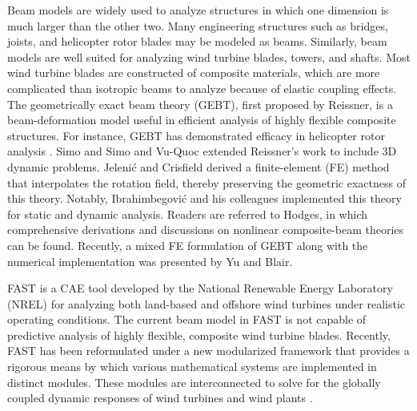 \documentclass{aiaa-tc}
\begin{document}
Beam models are widely used to analyze structures in which one dimension is much larger than the other two.  Many engineering
structures such as  bridges, joists, and helicopter
rotor blades may be modeled as beams.  Similarly, beam models are well suited for analyzing wind turbine blades, towers, and shafts.  Most wind turbine
blades are constructed of composite materials, which are more complicated than isotropic beams to analyze because of elastic coupling
effects.  The geometrically exact beam theory (GEBT), first proposed by
Reissner\cite{Ressiner1973}, is a beam-deformation model useful in efficient analysis of highly flexible composite structures.
For instance, GEBT has demonstrated efficacy in helicopter rotor analysis \cite{Hodges:2007}. 
Simo\cite{Simo1985} and Simo and Vu-Quoc\cite{Simo1986} extended Reissner's
work to include 3D dynamic problems. Jeleni\'c and
Crisfield\cite{Crisfield1999} derived a finite-element (FE) method that
interpolates the rotation field, thereby preserving the geometric exactness
of this theory. Notably, Ibrahimbegovi\'c and his colleagues
implemented this theory for static\cite{Ibrahim1995} and
dynamic\cite{Ibrahim1998} analysis. Readers are referred to
Hodges\cite{HodgesBeamBook}, in which comprehensive derivations and discussions
on nonlinear composite-beam theories can be found. Recently, a mixed
 FE formulation of GEBT along with the numerical implementation was presented by
Yu and Blair\cite{YuGEBT}.  

FAST is a CAE tool developed by the National Renewable Energy Laboratory
(NREL) for analyzing both land-based and
offshore wind turbines under realistic operating conditions.  The current
beam model in FAST is not capable of predictive analysis of highly flexible,
composite wind turbine blades.
Recently, FAST has been reformulated under a
new modularized framework that provides a rigorous means by which various
mathematical systems are implemented in distinct modules. These modules are interconnected
to solve for the globally coupled dynamic responses of wind turbines and wind
plants \cite{Jonkman:2013,website:FASTModularizationFramework}.
\end{document}
